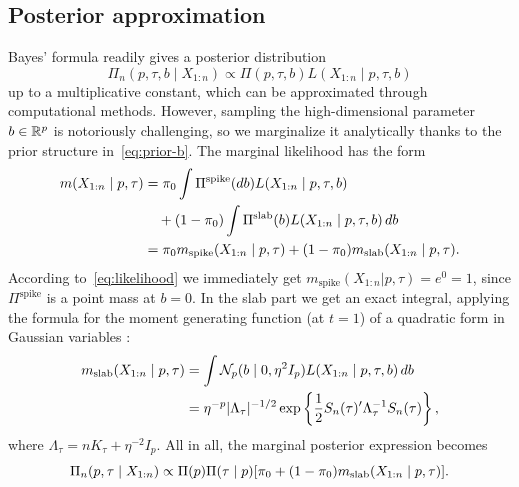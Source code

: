 \subsection{Posterior approximation}\label{sec:posterior-approximation}

Bayes' formula readily gives a posterior distribution 
\[
  \Pi_n(p, \tau, b \mid X_{1:n}) \propto \Pi(p, \tau, b)L(X_{1:n}\mid p, \tau, b)
\] 
up to a multiplicative constant, which can be approximated through computational methods. However, sampling the high-dimensional parameter \(b\in \mathbb{R}^p\) is notoriously challenging, so we marginalize it analytically thanks to the prior structure in~\eqref{eq:prior-b}. The marginal likelihood has the form
\begin{align*}
  m(X_{1:n}\mid p, \tau) &= \pi_0\int \Pi^{\text{spike}}(db)L(X_{1:n}\mid p, \tau, b)\\
  &\quad + (1-\pi_0)\int \Pi^{\text{slab}}(b)L(X_{1:n}\mid p, \tau, b)\, db\\
  &= \pi_0 m_{\text{spike}}(X_{1:n}\mid p, \tau) + (1-\pi_0)m_{\text{slab}}(X_{1:n}\mid p, \tau).
\end{align*}
According to~\eqref{eq:likelihood} we immediately get \(m_{\text{spike}}(X_{1:n}|p,\tau)=e^0=1\), since \(\Pi^{\text{spike}}\) is a point mass at \(b=0\). In the slab part we get an exact integral, applying the formula for the moment generating function (at \(t=1\)) of a quadratic form in Gaussian variables \citep[Corollary 3.2a.1]{mathai1992quadratic}:
\begin{equation}\label{eq:m-slab}
  \begin{split}
  m_{\text{slab}}(X_{1:n}\mid p, \tau) &= \int \mathcal N_p(b\mid 0, \eta^2 I_p)L(X_{1:n}\mid p, \tau, b)\, db \\
  &= \eta^{-p} |\Lambda_\tau|^{-1/2}\exp\left\{\frac{1}{2}S_n(\tau)' \Lambda_\tau^{-1}S_n(\tau)\right\},
  \end{split}
\end{equation}
where \(\Lambda_\tau = nK_\tau + \eta^{-2}I_p\). All in all, the marginal posterior expression becomes
\begin{equation}\label{eq:posterior-p-tau}
\Pi_n(p, \tau\mid X_{1:n}) \propto \Pi(p)\Pi(\tau\mid p)[\pi_0 + (1-\pi_0)m_{\text{slab}}(X_{1:n}\mid p, \tau)].
\end{equation}

